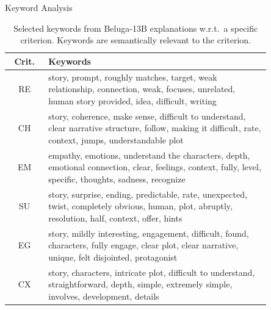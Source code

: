 \begin{frame}{Keyword Analysis}
    \begin{table}[!h]
        \scriptsize
        \centering
        \begin{tabular}{cp{0.85\linewidth}}
        \toprule
        \textbf{Crit.} & \textbf{Keywords}\\
        \midrule
        RE & story, prompt, roughly matches, target, weak relationship, connection, weak, focuses, unrelated, human story provided, idea, difficult, writing\\
        \midrule
        CH & story, coherence, make sense, difficult to understand, clear narrative structure, follow, making it difficult, rate, context, jumps, understandable plot\\
        \midrule
        EM & empathy, emotions, understand the characters, depth, emotional connection, clear, feelings, context, fully, level, specific, thoughts, sadness, recognize\\
        \midrule
        SU & story, surprise, ending, predictable, rate, unexpected, twist, completely obvious, human, plot, abruptly, resolution, half, context, offer, hints\\
        \midrule
        EG & story, mildly interesting, engagement, difficult, found, characters, fully engage, clear plot, clear narrative, unique, felt disjointed, protagonist\\
        \midrule
        CX &  story, characters, intricate plot, difficult to understand, straightforward, depth, simple, extremely simple, involves, development, details\\
        \bottomrule
        \end{tabular}
        \caption{Selected keywords from Beluga-13B explanations w.r.t.\ a specific criterion. Keywords are semantically relevant to the criterion.}
        \label{tab:explanation_keywords}
    \end{table}
\end{frame}

